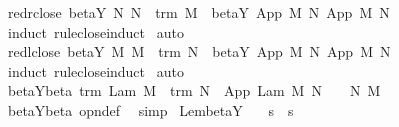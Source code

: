 \begin{isabellebody}
%
\isadelimproof
\isanewline
%
\endisadelimproof
\isanewline
{}\isamarkupfalse%
\ red{\isacharunderscore}r{\isacharunderscore}close{\isacharcolon}\ {\isachardoublequoteopen}beta{\isacharunderscore}Y{\isacharasterisk}\ N\ N{\isacharprime}\ {\isasymLongrightarrow}\ trm\ M\ {\isasymLongrightarrow}\ beta{\isacharunderscore}Y{\isacharasterisk}\ {\isacharparenleft}App\ M\ N{\isacharparenright}\ {\isacharparenleft}App\ M\ N{\isacharprime}{\isacharparenright}{\isachardoublequoteclose}\isanewline
%
\isadelimproof
%
\endisadelimproof
%
\isatagproof
{}\isamarkupfalse%
\ {\isacharparenleft}induct\ rule{\isacharcolon}close{\isachardot}induct{\isacharparenright}\isanewline
{}\isamarkupfalse%
\ auto%
\endisatagproof
{\isafoldproof}%
%
\isadelimproof
\isanewline
%
\endisadelimproof
\isanewline
{}\isamarkupfalse%
\ red{\isacharunderscore}l{\isacharunderscore}close{\isacharcolon}\ {\isachardoublequoteopen}beta{\isacharunderscore}Y{\isacharasterisk}\ M\ M{\isacharprime}\ {\isasymLongrightarrow}\ trm\ N\ {\isasymLongrightarrow}\ beta{\isacharunderscore}Y{\isacharasterisk}\ {\isacharparenleft}App\ M\ N{\isacharparenright}\ {\isacharparenleft}App\ M{\isacharprime}\ N{\isacharparenright}{\isachardoublequoteclose}\isanewline
%
\isadelimproof
%
\endisadelimproof
%
\isatagproof
{}\isamarkupfalse%
\ {\isacharparenleft}induct\ rule{\isacharcolon}close{\isachardot}induct{\isacharparenright}\isanewline
{}\isamarkupfalse%
\ auto%
\endisatagproof
{\isafoldproof}%
%
\isadelimproof
\isanewline
%
\endisadelimproof
\isanewline
{}\isamarkupfalse%
\ beta{\isacharunderscore}Y{\isacharunderscore}beta{\isacharprime}{\isacharcolon}\ {\isachardoublequoteopen}trm\ {\isacharparenleft}Lam\ M{\isacharparenright}\ {\isasymLongrightarrow}\ trm\ N\ {\isasymLongrightarrow}\ App\ {\isacharparenleft}Lam\ M{\isacharparenright}\ N\ {\isasymRightarrow}\ {\isacharbraceleft}{}\ {\isasymrightarrow}\ N{\isacharbraceright}\ M{\isachardoublequoteclose}%
\isadelimproof
\ %
\endisadelimproof
%
\isatagproof
{}\isamarkupfalse%
\ beta{\isacharunderscore}Y{\isachardot}beta\ opn{\isacharprime}{\isacharunderscore}def\ \isamarkupfalse%
\ simp%
\endisatagproof
{\isafoldproof}%
%
\isadelimproof
%
\endisadelimproof
\isanewline
\isanewline
{}\isamarkupfalse%
\ Lem{}{\isacharunderscore}{}{\isacharunderscore}{}{\isacharprime}{\isacharunderscore}beta{\isacharunderscore}Y{\isacharcolon}\isanewline
\ \ \ {\isachardoublequoteopen}s\ {\isasymRightarrow}\ s{\isacharprime}{\isachardoublequoteclose}\isanewline

\end{isabellebody}
